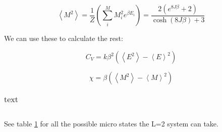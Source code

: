 \[
\left< M^2 \right> = \frac{1}{Z} \left( \sum_i^M M_i^2 e^{\beta E_i}\right) = \frac{2 \left( e^{8J\beta } + 2\right) }{\cosh (8J\beta ) + 3}
\]

We can use these to calculate the rest:

\[
C_V = k \beta^2\left( \left< E^2\right> - \left< E\right>^2 \right)
\]

\[
\chi = \beta \left( \left< M^2\right> - \left< M\right>^2\right)
\]

\begin{table}[H]
	\caption{text}
	\label{tab: makro}
\begin{tabular}{cccccc}
	
\end{tabular}
\end{table}

See table \ref{tab: makro} for all the possible micro states the L=2 system can take. 


